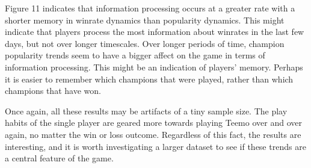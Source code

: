\documentclass[twoside]{article}
\begin{document}
\begin{multicols}{2}
Figure 11 indicates that information processing occurs at a greater rate with a shorter memory in winrate dynamics than popularity dynamics. This might indicate that players process the most information about winrates in the last few days, but not over longer timescales. Over longer periods of time, champion popularity trends seem to have a bigger affect on the game in terms of information processing. This might be an indication of players' memory. Perhaps it is easier to remember which champions that were played, rather than which champions that have won.

Once again, all these results may be artifacts of a tiny sample size. The play habits of the single player are geared more towards playing Teemo over and over again, no matter the win or loss outcome. Regardless of this fact, the results are interesting, and it is worth investigating a larger dataset to see if these trends are a central feature of the game.



\end{multicols}
\end{document}
